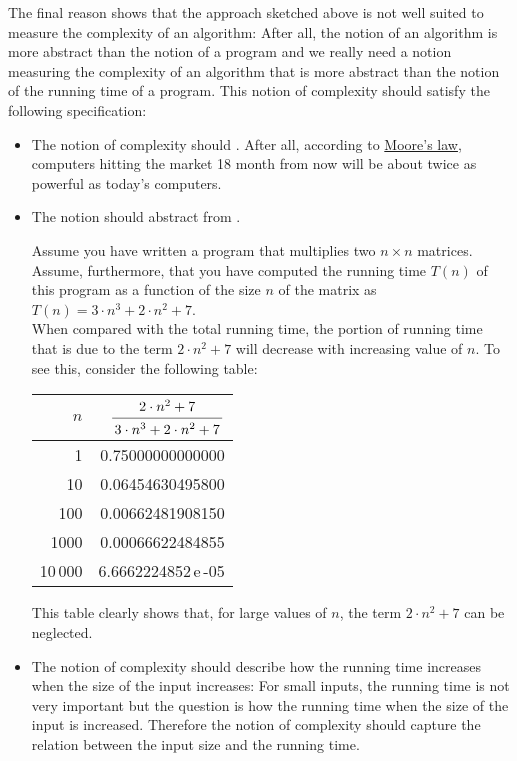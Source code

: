 The final reason shows that the approach sketched above is not well suited to measure the complexity of
an algorithm: After all, the notion of an algorithm is more abstract than the notion of a program
and we really need a notion measuring the complexity of an algorithm that is more abstract than the
notion of the running time of a program.  This notion of complexity should satisfy the following
specification: 
\begin{itemize}
\item The notion of complexity should .  After all, according to 
      \href{http://en.wikipedia.org/wiki/Moore's_law}{Moore's law}, 
      computers hitting the market 18 month from now will be about twice as powerful as today's computers.

\item The notion should abstract from .

      Assume you have written a program that  multiplies two $n \times n$ matrices.  Assume,
      furthermore, that you have computed the running time $T(n)$ of this program as a function 
      of the size $n$ of the matrix as
      \\[0.2cm]
      \hspace*{1.3cm} $T(n) = 3 \cdot n^3 + 2 \cdot n^2 + 7$. 
      \\[0.2cm]
      When compared with the total running time, the portion of running time that is due to the term 
      $2\cdot n^2 + 7$ will decrease with increasing value of $n$.  To see this, consider the
      following table:
      \\[0.3cm]
      \hspace*{1.3cm} 
      \begin{tabular}{|r|r|}
        \hline
        $n$  & \rule{0pt}{16pt} $\bruch{2 \cdot n^2 + 7}{3 \cdot n^3 + 2 \cdot n^2 + 7}$ \\[0.3cm]
        \hline
        \hline
        1       &  0.75000000000000  \\
        10      &  0.06454630495800  \\
        100     &  0.00662481908150  \\
        1000    &  0.00066622484855  \\
        10\,000 &  6.6662224852\,e\,-05  \\
       \hline
      \end{tabular}

      This table clearly shows that, for large values of $n$, the term $2 \cdot n^2 + 7$ can be
      neglected. 
\item The notion of complexity should describe how the running time increases
      when the size of the input increases:  For small inputs, the running time is not very
      important but the question is how the running time  when the size of the input is increased. 
      Therefore the notion of complexity should capture the relation between the input size and the running time.
\end{itemize}
